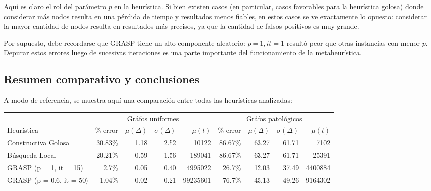 Aquí es claro el rol del parámetro $p$ en la heurística. Si bien existen casos (en particular, casos favorables para la heurística golosa) donde considerar más nodos resulta en una pérdida de tiempo y resultados menos fiables, en estos casos se ve exactamente lo opuesto: considerar la mayor cantidad de nodos resulta en resultados más precisos, ya que la cantidad de falsos positivos es muy grande.

Por supuesto, debe recordarse que GRASP tiene un alto componente aleatorio: $p = 1, it = 1$ resultó peor que otras instancias con menor $p$. Depurar estos errores luego de sucesivas iteraciones es una parte importante del funcionamiento de la metaheurística.

\subsection*{Resumen comparativo y conclusiones}

A modo de referencia, se muestra aquí una comparación entre todas las heurísticas analizadas:

\begin{center}
    \begin{tabular}{| l | r | r | r | r | r | r | r | r |}
        \hline
                                 & \multicolumn{4}{|c|}{Gráfos uniformes}                            & \multicolumn{4}{|c|}{Gráfos patológicos}    \\ \cline{2-9}
        Heurística               & \% error & $\mu(\Delta)$ & $\sigma(\Delta)$ & $\mu(t)$ & \% error & $\mu(\Delta)$ & $\sigma(\Delta)$ & $\mu(t)$ \\ \hline
        Constructiva Golosa      &  30.83\% &          1.18 &             2.52 &    10122 &  86.67\% &         63.27 &            61.71 &     7102 \\ \hline
        Búsqueda Local           &  20.21\% &          0.59 &             1.56 &   189041 &  86.67\% &         63.27 &            61.71 &    25391 \\ \hline
        GRASP (p = 1, it = 15)   &    2.7\% &          0.05 &             0.40 &  4995022 &   26.7\% &         12.03 &            37.49 &  4400884 \\ \hline
        GRASP (p = 0.6, it = 50) &   1.04\% &          0.02 &             0.21 & 99235601 &   76.7\% &         45.13 &            49.26 &  9164302 \\
        \hline
    \end{tabular}
\end{center}

